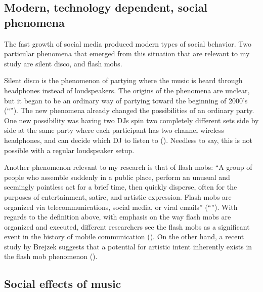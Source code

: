 \subsection{Modern, technology dependent, social phenomena}


The fast growth of social media produced modern types of social behavior.
Two particular phenomena that emerged from this situation that are relevant to my study are silent disco, and flash mobs.

Silent disco is the phenomenon of partying where the music is heard through headphones instead of loudspeakers.
The origins of the phenomena are unclear, but it began to be an ordinary way of partying toward the beginning of 2000's (``'').
The new phenomena already changed the possibilities of an ordinary party.
One new possibility was having two DJs spin two completely different sets side by side at the same party where each participant has two channel wireless headphones, and can decide which DJ to listen to (\cite{web:headphonedisco}).
Needless to say, this is not possible with a regular loudspeaker setup.

Another phenomenon relevant to my research is that of flash mobs: ``A group of people who assemble suddenly in a public place, perform an unusual and seemingly pointless act for a brief time, then quickly disperse, often for the purposes of entertainment, satire, and artistic expression. Flash mobs are organized via telecommunications, social media, or viral emails'' (``'').
With regards to the definition above, with emphasis on the way flash mobs are organized and executed, different researchers see the flash mobs as a significant event in the history of mobile communication (\cite{nicholson05}).
On the other hand, a recent study by Brejzek suggests that a potential for artistic intent inherently exists in the flash mob phenomenon (\cite*{brejzek10}).

\subsection{Social effects of music}


